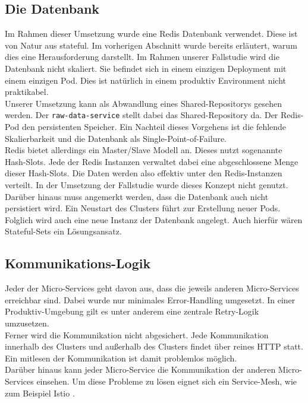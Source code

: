 \subsection{Die Datenbank}
Im Rahmen dieser Umsetzung wurde eine Redis Datenbank verwendet. Diese ist von Natur aus stateful. Im vorherigen Abschnitt wurde bereits erläutert, warum dies eine Herausforderung darstellt. Im Rahmen unserer Fallstudie wird die Datenbank nicht skaliert. Sie befindet sich in einem einzigen Deployment mit einem einzigen Pod. Dies ist natürlich in einem produktiv Environment nicht praktikabel. \\
Unserer Umsetzung kann als Abwandlung eines Shared-Repositorys gesehen werden. Der \lstinline{raw-data-service} stellt dabei das Shared-Repository da. Der Redis-Pod den persistenten Speicher. Ein Nachteil dieses Vorgehens ist die fehlende Skalierbarkeit und die Datenbank als Single-Point-of-Failure.\\
Redis bietet allerdings ein Master/Slave Modell an. Dieses nutzt sogenannte Hash-Slots. Jede der Redis Instanzen verwaltet dabei eine abgeschlossene Menge dieser Hash-Slots. Die Daten werden also effektiv unter den Redis-Instanzen verteilt. In der Umsetzung der Fallstudie wurde dieses Konzept nicht genutzt. \cite{noauthor_redis_nodate} \\
Darüber hinaus muss angemerkt werden, dass die Datenbank auch nicht persistiert wird. Ein Neustart des Clusters führt zur Erstellung neuer Pods. Folglich wird auch eine neue Instanz der Datenbank angelegt. Auch hierfür wären Stateful-Sets \cite{noauthor_statefulsets_nodate} ein Lösungsansatz. 
\subsection{Kommunikations-Logik}
Jeder der Micro-Services geht davon aus, dass die jeweils anderen Micro-Services erreichbar sind. Dabei wurde nur minimales Error-Handling umgesetzt. In einer Produktiv-Umgebung gilt es unter anderem eine zentrale Retry-Logik umzusetzen.\\
Ferner wird die Kommunikation nicht abgesichert. Jede Kommunikation innerhalb des Clusters und außerhalb des Clusters findet über reines HTTP statt. Ein mitlesen der Kommunikation ist damit problemlos möglich.\\
Darüber hinaus kann jeder Micro-Service die Kommunikation der anderen Micro-Services einsehen. Um diese Probleme zu lösen eignet sich ein Service-Mesh, wie zum Beispiel Istio \cite{istio_istio_nodate}.
















